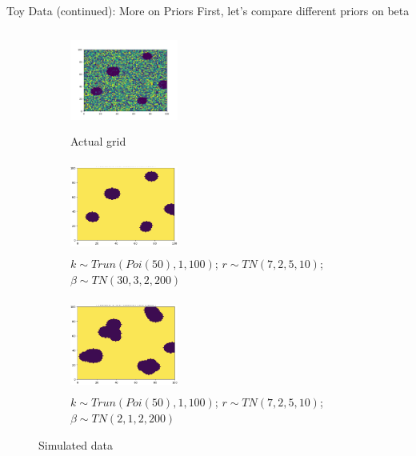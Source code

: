 \documentclass[10pt,mathserif]{beamer}
\begin{document}
\begin{frame}{Toy Data (continued): More on Priors}
First, let's compare different priors on beta
\begin{figure}[t!]
    \centering
    \begin{subfigure}[t]{0.3\textwidth}
        \centering
        \includegraphics[height=1.3in, width=1.4in]{../BDC_gridactual}
        \caption{Actual grid}
    \end{subfigure}%
    \begin{subfigure}[t]{0.3\textwidth}
        \centering
        \includegraphics[height=1.2in, width=1.4in]{../BDC_grid2_strongsig}
        \caption{ $k \sim Trun(Poi(50), 1, 100)$; $r \sim TN(7, 2, 5, 10)$; $\beta \sim TN(30, 3, 2, 200)$}
    \end{subfigure}%
        \begin{subfigure}[t]{0.3\textwidth}
        \centering
        \includegraphics[height=1.2in, width=1.4in]{../BDC_grid3_weaksig}
        \caption{ $k \sim Trun(Poi(50), 1, 100)$; $r \sim TN(7, 2, 5, 10)$; \textbf{$\beta \sim TN(2, 1, 2, 200)$}}
    \end{subfigure}
    \caption{Simulated data}
\end{figure}
\end{frame}
\end{document}
